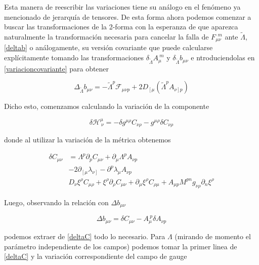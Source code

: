 \documentclass{article}
\numberwithin{equation}{section}
\begin{document}
Esta manera de reescribir las variaciones tiene su análogo en el fenómeno ya mencionado de jerarquía de tensores. De esta forma ahora podemos comenzar a buscar las transformaciones de la 2-forma con la esperanza de que aparezca naturalmente la transformación necesaria para cancelar la falla de $ F_{\mu \nu}^{\ \ m} $ ante $ \widetilde{\Lambda} $, \ref{deltab} o análogamente, su versión covariante que puede calcularse explícitamente tomando las transformaciones $ \delta_{\widetilde{\Lambda}} A_{\mu}^{\ m} $ y $\delta_{\widetilde{\Lambda}} b_{\mu \nu} $  e ntroduciendolas en \ref{variacioncovariante} para obtener
	
\begin{equation}\label{salvafalla}
\Delta_{\widetilde{\Lambda}}b_{\mu \nu} = -\widetilde{\Lambda}^p \mathcal{F}_{\mu \nu p} + 2 D_{\left[ \mu \right.} \left( \widetilde{\Lambda}^p A_{\left.\nu\right] p} \right)
\end{equation}


Dicho esto, comenzamos calculando la variación de la componente

\begin{equation}
\delta \mathcal{H}^{\mu}_{\ \nu} = - \delta g^{\mu \rho} C_{\nu \rho} - g^{\mu \rho} \delta C_{\nu \rho}
\end{equation}

donde al utilizar la variación de la métrica obtenemos

\begin{equation}\label{deltaC}
\begin{aligned}
\delta C_{\mu \nu} &= \Lambda^p \partial_p C_{\mu \nu} + \partial_{\mu} \Lambda^p A_{\nu p}\\
&-2 \partial_{\left[\mu \right.} \lambda_{\left. \nu \right]} - \partial^p \lambda_{\mu} A_{\nu p}\\
& D_{\nu} \xi^{\rho} C_{\mu \rho} + \xi^{\rho} \partial_{\rho} C_{\mu \nu} + \partial_{\mu} \xi^{\rho} C_{\rho \mu} + A_{\mu p}M^{p n} g_{\nu \rho} \partial_n \xi^{\rho}  
\end{aligned}
\end{equation}

Luego, observando la relación con $ \Delta b_{\mu \nu} $

\begin{equation}\label{bdeC}
\Delta b_{\mu \nu} = \delta C_{\mu \nu} - A_{\mu}^{\ p} \delta A_{\nu p}
\end{equation}

podemos extraer de \ref{deltaC} todo lo necesario. Para $ \Lambda $ (mirando de momento el parámetro independiente de los campos) podemos tomar la primer linea de \ref{deltaC} y la variación correspondiente del campo de gauge
\end{document}
